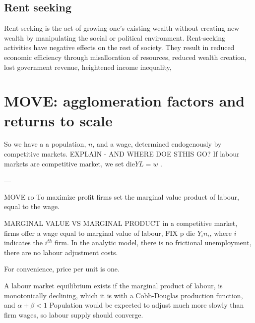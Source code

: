 \subsection{Rent seeking}
  Rent-seeking is the act of growing one's existing wealth without creating new wealth by manipulating the social or political environment. Rent-seeking activities have negative effects on the rest of society. They result in reduced economic efficiency through misallocation of resources, reduced wealth creation, lost government revenue, heightened income inequality,


\section{MOVE: agglomeration factors and returns to scale}

So we have a a population, $n$, and a wage, determined endogenously by competitive markets. 
EXPLAIN - AND WHERE DOE STHIS GO?
If labour markets are \gls{competitive market}, we set die${Y}{L}=w$ .

---

MOVE ro
To maximize profit  firms set the marginal value product of labour, %
equal to the wage. 

MARGINAL VALUE VS MARGINAL PRODUCT
in a competitive market, firms offer a wage equal to marginal value of labour, 
FIX p die ${Y_i}{n_i}$, where $i$ indicates the $i^{th}$ firm. In the analytic model, there is no \gls{frictional unemployment}, there are no \glspl{labour adjustment cost}. 

 For convenience, price per unit is one. 

A labour market equilibrium exists if the marginal product of labour, is monotonically declining, which it is with a \gls{Cobb-Douglas} production function, and $\alpha + \beta<1$ 
Population would be expected to adjust much more slowly than firm wages, so labour supply should converge.

